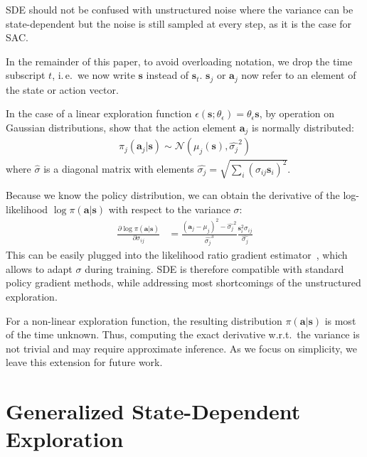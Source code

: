 \documentclass{article}
\newcommand{\ie}{i.\,e.\ }
\newcommand{\state}{\mathbf{s}}
\newcommand{\action}{\mathbf{a}}
\newcommand{\st}{{\state_t}}
\newcommand{\policy}{\pi}
\newcommand{\normal}{\mathcal{N}}
\newcommand{\noise}{\epsilon}
\newcommand{\sde}{State-Dependent Exploration\xspace}
\newcommand{\SDE}{\textsc{SDE}\xspace}
\newcommand{\sac}{\textsc{SAC}\xspace}
\begin{document}
\SDE should not be confused with unstructured noise where the variance can be state-dependent but the noise is still sampled at every step, as it is the case for \sac.

In the remainder of this paper, to avoid overloading notation, we drop the time subscript $t$, \ie we now write $\state$ instead of $\st$. $\state_j$ or $\action_j$ now refer to an element of the state or action vector.

In the case of a linear exploration function $\noise(\state; \theta_\noise) = \theta_\noise \state$, by operation on Gaussian distributions, \citet{ruckstiess2008state} show that the action element $\action_j$ is normally distributed:
\begin{align}
  \label{eq:sde-distri}
  \policy_j(\action_j|\state) \sim \normal(\mu_j(\state), \hat{\sigma_j}^2)
\end{align}
where $\hat{\sigma}$ is a diagonal matrix with elements $\hat{\sigma_j} = \sqrt{\sum_i{(\sigma_{ij} \state_i)^2}}$.

Because we know the policy distribution, we can obtain the derivative of the log-likelihood $\log \policy(\action|\state)$ with respect to the variance $\sigma$:
\begin{align}
  \label{eq:sde-logprob}
  \frac{\partial \log \policy(\action|\state)}{\partial \sigma_{ij}}
  &= \frac{(\action_j - \mu_j)^2 - \hat{\sigma_j}^2}{\hat{\sigma_j}^3}
  \frac{\state_i^2 \sigma_{ij}}{\hat{\sigma_{j}}}
\end{align}
This can be easily plugged into the likelihood ratio gradient estimator~\citep{williams1992simple}, which allows to adapt $\sigma$ during training.
\SDE is therefore compatible with standard policy gradient methods, while addressing most shortcomings of the unstructured exploration.

For a non-linear exploration function, the resulting distribution $\policy(\action|\state)$ is most of the time unknown. Thus, computing the exact derivative w.r.t.\ the variance is not trivial and may require approximate inference. As we focus on simplicity, we leave this extension for future work.

\section{Generalized \sde}
\label{sec:gsde}
\end{document}

